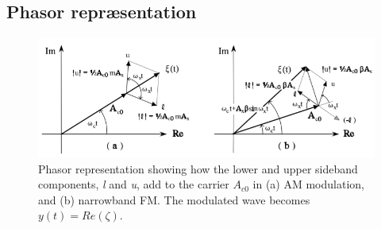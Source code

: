\subsection{Phasor repræsentation}

\begin{figure} [H]
	\centering
	\includegraphics[width=\linewidth]{graphics/9.png}
	\caption{Phasor representation showing how the lower and upper sideband components, \textit{l}	and \textit{u}, add to the carrier $A_{c0}$ in (a) AM modulation, and (b) narrowband FM. The modulated wave becomes $y(t)=Re(\zeta)$.}
	\label{fig:9}
\end{figure}
